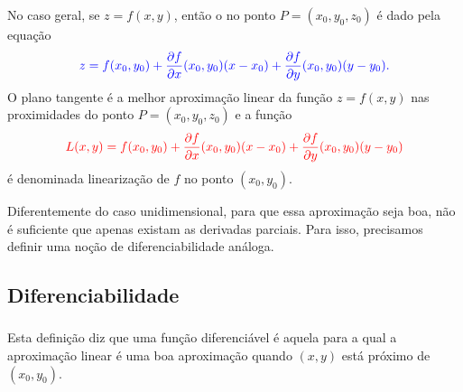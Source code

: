 \begin{frame}[label=der-parciais]
No caso geral, se $z=f(x,y)$, então o  no ponto $P=(x_0,y_0,z_0)$ é dado pela equação
\begin{equation}\label{plano_tang}
{\color{blue}z=f(x_0,y_0)+\frac{\partial f}{\partial x}(x_0,y_0)(x-x_0)+\frac{\partial f}{\partial y}(x_0,y_0)(y-y_0).}
\end{equation}
O plano tangente é a {\color{red} melhor aproximação linear} da função {$z=f(x,y)$}	nas proximidades do ponto $P=(x_0,y_0,z_0)$ e a função 
\[{\color{red}L(x,y)=f(x_0,y_0)+\frac{\partial f}{\partial x}(x_0,y_0)(x-x_0)+\frac{\partial f}{\partial y}(x_0,y_0)(y-y_0)}\]
é denominada {\color{red}linearização} de $f$ no ponto $(x_0,y_0)$. 
\bigskip

\begin{alertblock}{ }
Diferentemente do caso unidimensional, para que essa aproximação seja boa, {\color{red}não é suficiente} que apenas existam as derivadas parciais. Para isso, precisamos definir uma noção de diferenciabilidade análoga.
\end{alertblock}
			
\end{frame}







\subsection*{Diferenciabilidade}
\begin{frame}[label=der-parciais]
	\frametitle{ }
		
		
\begin{alertblock}{ }
Esta definição diz que uma função diferenciável é aquela para a qual a aproximação linear é uma boa aproximação quando $(x,y)$ está próximo de $(x_0,y_0)$.
\end{alertblock}
	
\end{frame}

